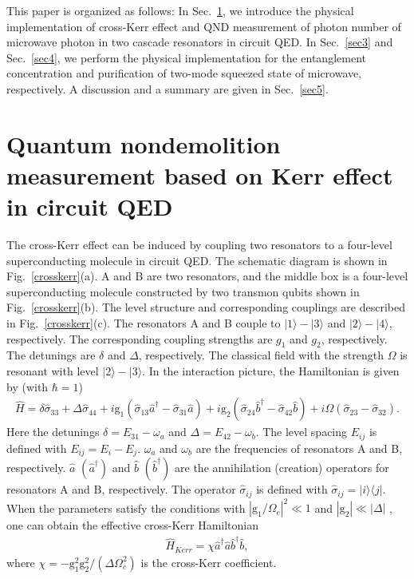\documentclass[preprintnumbers,showkeys,amsmath,amssymb]{revtex4}%
\begin{document}
This paper is organized as follows: In Sec.~\ref{sec2}, we introduce
the physical implementation of cross-Kerr effect and QND measurement
of photon number of microwave photon in two cascade resonators in
circuit QED.
In Sec.~\ref{sec3} and Sec.~\ref{sec4}, we perform the physical
implementation for the entanglement concentration and purification
of two-mode squeezed state of microwave, respectively. A discussion
and a summary are given in Sec.~\ref{sec5}.





\section{Quantum nondemolition measurement based on Kerr effect in circuit QED}  \label{sec2}

The cross-Kerr effect can be induced by coupling two resonators to a
four-level superconducting molecule in circuit QED. The schematic
diagram is shown in Fig.~\ref{crosskerr}(a). A and B are two
resonators, and the middle box is a four-level superconducting
molecule constructed by two transmon qubits \cite{JKoch} shown in
Fig.~\ref{crosskerr}(b). The level structure and corresponding
couplings are described in Fig.~\ref{crosskerr}(c). The resonators A
and B couple to $|1\rangle-|3\rangle$ and $|2\rangle-|4\rangle$,
respectively. The corresponding coupling strengths are $g_{1}$ and
$g_{2}$, respectively. The detunings are $\delta$ and $\Delta$,
respectively. The classical field with the strength $\Omega$ is
resonant with level $|2\rangle-|3\rangle$. In the interaction
picture, the Hamiltonian is given by \cite{YHu} (with $\hbar=1$)
\begin{eqnarray}        \label{eq2}
\hat{H}\!=\!\delta\hat{\sigma}_{33}+\Delta\hat{\sigma}_{44}
+i\text{g}_{1}\left(\hat{\sigma}_{13}\hat{a}^{\dag}-\hat{\sigma}_{31}\hat{a}\right)+i\text{g}_{2}\left(\hat{\sigma}_{24}\hat{b}^{\dag}-\hat{\sigma}_{42}\hat{b}\right)
+i\Omega\left(\hat{\sigma}_{23}-\hat{\sigma}_{32}\right).
\end{eqnarray}
Here the detunings $\delta=E_{31}-\omega_{a}$ and
$\Delta=E_{42}-\omega_{b}$. The level spacing $E_{ij}$ is defined
with $E_{ij}=E_{i}-E_{j}$. $\omega_{a}$ and $\omega_{b}$ are the
frequencies of resonators A and B, respectively. $\hat{a}$
$(\hat{a}^{\dag})$ and $\hat{b}$ $(\hat{b}^{\dag})$ are the
annihilation (creation) operators for resonators A and B,
respectively. The operator $\hat{\sigma}_{ij}$ is defined with
$\hat{\sigma}_{ij}=|i\rangle\langle j|$. When the parameters satisfy
the conditions with  $|\text{g}_{1}/\Omega_{c}|^{2}\ll 1$ and
$|\text{g}_{2}|\ll|\Delta|$ \cite{AImamoglu1997}, one can obtain the
effective cross-Kerr Hamiltonian \cite{YHu}
\begin{eqnarray}        \label{eq3}
\hat{H}_{Kerr}=\chi\hat{a}^{\dag}\hat{a}\hat{b}^{\dag}\hat{b},
\end{eqnarray}
where
$\chi=-\text{g}_{1}^{2}\text{g}_{2}^{2}/(\Delta\Omega^{2}_{c})$ is
the cross-Kerr coefficient.
\end{document}
